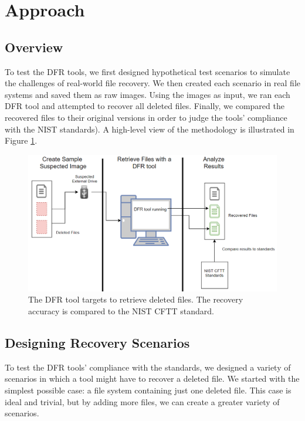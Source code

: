 \section{Approach}

\subsection{Overview}

To test the DFR tools, we first designed hypothetical test scenarios to simulate the challenges of real-world file recovery.
We then created each scenario in real file systems and saved them as raw images. 
Using the images as input, we ran each DFR tool and attempted to recover all deleted files. 
Finally, we compared the recovered files to their original versions in order to judge the tools' 
compliance with the NIST standards). A high-level view of the methodology is illustrated in Figure \ref{fig:overview}.

\begin{figure}[h]
    \centering
    \includegraphics[width=\linewidth]{fig/overview.png}
    \caption{The DFR tool targets to retrieve deleted files. The recovery accuracy is compared to the NIST CFTT standard.}
    \label{fig:overview}
\end{figure}

\subsection{Designing Recovery Scenarios}
To test the DFR tools' compliance with the standards, we designed a variety of scenarios in which a tool might have to recover a deleted file. 
We started with the simplest possible case: a file system containing just one deleted file. 
This case is ideal and trivial, but by adding more files, we can create a greater variety of scenarios.


